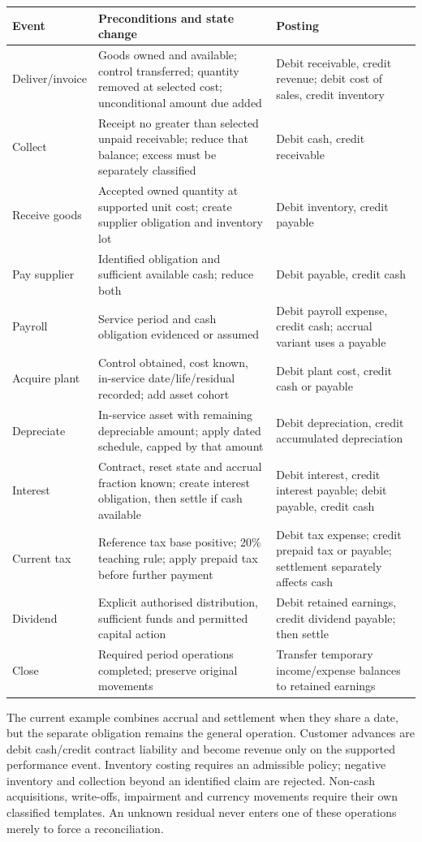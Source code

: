 \begin{longtable}{L{27mm}L{60mm}L{49mm}}
\toprule Event & Preconditions and state change & Posting\\\midrule\endhead
Deliver/invoice & Goods owned and available; control transferred; quantity
removed at selected cost; unconditional amount due added & Debit receivable,
credit revenue; debit cost of sales, credit inventory\\
Collect & Receipt no greater than selected unpaid receivable; reduce that
balance; excess must be separately classified & Debit cash, credit receivable\\
Receive goods & Accepted owned quantity at supported unit cost; create supplier
obligation and inventory lot & Debit inventory, credit payable\\
Pay supplier & Identified obligation and sufficient available cash; reduce
both & Debit payable, credit cash\\
Payroll & Service period and cash obligation evidenced or assumed & Debit
payroll expense, credit cash; accrual variant uses a payable\\
Acquire plant & Control obtained, cost known, in-service date/life/residual
recorded; add asset cohort & Debit plant cost, credit cash or payable\\
Depreciate & In-service asset with remaining depreciable amount; apply dated
schedule, capped by that amount & Debit depreciation, credit accumulated
depreciation\\
Interest & Contract, reset state and accrual fraction known; create interest
obligation, then settle if cash available & Debit interest, credit interest
payable; debit payable, credit cash\\
Current tax & Reference tax base positive; 20\% teaching rule; apply prepaid
tax before further payment & Debit tax expense; credit prepaid tax or payable;
settlement separately affects cash\\
Dividend & Explicit authorised distribution, sufficient funds and permitted
capital action & Debit retained earnings, credit dividend payable; then settle\\
Close & Required period operations completed; preserve original movements &
Transfer temporary income/expense balances to retained earnings\\\bottomrule
\end{longtable}

The current example combines accrual and settlement when they share a date,
but the separate obligation remains the general operation. Customer advances
are debit cash/credit contract liability and become revenue only on the
supported performance event. Inventory costing requires an admissible policy;
negative inventory and collection beyond an identified claim are rejected.
Non-cash acquisitions, write-offs, impairment and currency movements require
their own classified templates. An unknown residual never enters one of these
operations merely to force a reconciliation.

